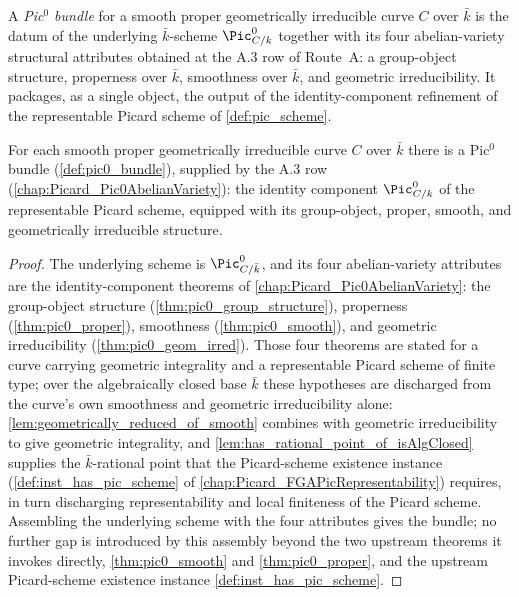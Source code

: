 \begin{definition}
  \label{def:pic0_bundle}

  A \emph{Pic\(^0\) bundle} for a smooth proper geometrically irreducible
  curve \(C\) over \(\bar k\) is the datum of the underlying \(\bar k\)-scheme
  \(\Pic^0_{C/k}\) together with its four abelian-variety structural
  attributes obtained at the A.3 row of Route~A: a group-object structure,
  properness over \(\bar k\), smoothness over \(\bar k\), and geometric
  irreducibility. It packages, as a single object, the output of the
  identity-component refinement of the representable Picard scheme of
  \cref{def:pic_scheme}.
\end{definition}

\begin{definition}
  \label{def:pic0_bundle_carrier}

  For each smooth proper geometrically irreducible curve \(C\) over \(\bar k\)
  there is a Pic\(^0\) bundle (\cref{def:pic0_bundle}), supplied by the A.3
  row (\cref{chap:Picard_Pic0AbelianVariety}): the identity component
  \(\Pic^0_{C/k}\) of the representable Picard scheme, equipped with its
  group-object, proper, smooth, and geometrically irreducible structure.
\end{definition}

\begin{proof}
  The underlying scheme is \(\Pic^0_{C/\bar k}\), and its four
  abelian-variety attributes are the identity-component theorems of
  \cref{chap:Picard_Pic0AbelianVariety}: the group-object structure
  (\cref{thm:pic0_group_structure}), properness
  (\cref{thm:pic0_proper}), smoothness (\cref{thm:pic0_smooth}), and
  geometric irreducibility (\cref{thm:pic0_geom_irred}). Those four theorems
  are stated for a curve carrying geometric integrality and a representable
  Picard scheme of finite type; over the algebraically closed base \(\bar k\)
  these hypotheses are discharged from the curve's own smoothness and
  geometric irreducibility alone:
  \cref{lem:geometrically_reduced_of_smooth} combines with geometric
  irreducibility to give geometric integrality, and
  \cref{lem:has_rational_point_of_isAlgClosed} supplies the \(\bar k\)-rational
  point that the Picard-scheme existence instance
  (\cref{def:inst_has_pic_scheme} of \cref{chap:Picard_FGAPicRepresentability})
  requires, in turn discharging representability and local finiteness of the
  Picard scheme. Assembling the underlying scheme with the four attributes
  gives the bundle; no further gap is introduced by this assembly beyond the
  two upstream theorems it invokes directly, \cref{thm:pic0_smooth} and
  \cref{thm:pic0_proper}, and the upstream Picard-scheme existence instance
  \cref{def:inst_has_pic_scheme}.
\end{proof}

